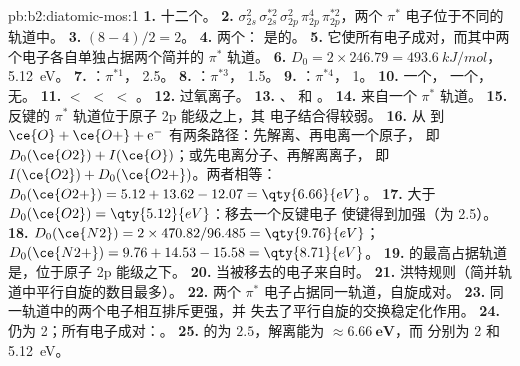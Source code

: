 \begin{solution}{pb:b2:diatomic-mos:1}
\textbf{1.} 十二个。
\textbf{2.} $\sigma_{2s}^2\,\sigma_{2s}^{*2}\,\sigma_{2p}^2\,\pi_{2p}^4\,\pi_{2p}^{*2}$，两个 $\pi^*$
电子位于不同的轨道中。
\textbf{3.} $(8 - 4)/2 = 2$。
\textbf{4.} 两个： 是的。
\textbf{5.} 它使所有电子成对，而其中两个电子各自单独占据两个简并的
$\pi^*$ 轨道。
\textbf{6.} $D_0 = 2 \times 246.79 = \qty{493.6}{kJ/mol}$，\qty{5.12}{eV}。
\textbf{7.} ：$\pi^{*1}$， 2.5。
\textbf{8.} ：$\pi^{*3}$， 1.5。
\textbf{9.} ：$\pi^{*4}$， 1。
\textbf{10.}  一个， 一个， 无。
\textbf{11.}  $<$  $<$  $<$ 。
\textbf{12.} 过氧离子。
\textbf{13.} 、 和 。
\textbf{14.} 来自一个 $\pi^*$ 轨道。
\textbf{15.} 反键的 $\pi^*$ 轨道位于原子 2p 能级之上，其
电子结合得较弱。
\textbf{16.} 从  到 $\ce{O} + \ce{O+} + \mathrm e^-$ 有两条路径：先解离、再电离一个原子，
即 $D_0(\ce{O2}) + I(\ce{O})$；或先电离分子、再解离离子，
即 $I(\ce{O2}) + D_0(\ce{O2+})$。两者相等：$D_0(\ce{O2+}) = 5.12 + 13.62 - 12.07 = \qty{6.66}{eV}$。
\textbf{17.} 大于 $D_0(\ce{O2}) = \qty{5.12}{eV}$：移去一个反键电子
使键得到加强（为 2.5）。
\textbf{18.} $D_0(\ce{N2}) = 2 \times 470.82/96.485 = \qty{9.76}{eV}$；$D_0(\ce{N2+}) = 9.76 +
14.53 - 15.58 = \qty{8.71}{eV}$。
\textbf{19.}  的最高占据轨道是，位于原子
2p 能级之下。
\textbf{20.} 当被移去的电子来自时。
\textbf{21.} 洪特规则（简并轨道中平行自旋的数目最多）。
\textbf{22.} 两个 $\pi^*$ 电子占据同一轨道，自旋成对。
\textbf{23.} 同一轨道中的两个电子相互排斥更强，并
失去了平行自旋的交换稳定化作用。
\textbf{24.} 仍为 2；所有电子成对：。
\textbf{25.}  的为 $\boldsymbol{2.5}$，解离能为
$\boldsymbol{\approx \qty{6.66}{eV}}$，而  分别为 2 和 \qty{5.12}{eV}。
\end{solution}
